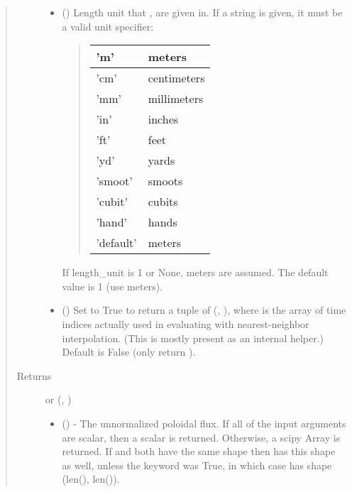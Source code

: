 \documentclass[letterpaper,10pt,english]{sphinxmanual}
\begin{document}
\begin{fulllineitems}
\begin{fulllineitems}
\begin{quote}
\begin{description}
\begin{itemize}
\item {} 
 () \textendash{} 
Length unit that ,  are given in.
If a string is given, it must be a valid unit specifier:
\begin{quote}


\begin{savenotes}\sphinxattablestart
\centering
\begin{tabulary}{\linewidth}[t]{|T|T|}
\hline

’m’
&
meters
\\
\hline
’cm’
&
centimeters
\\
\hline
’mm’
&
millimeters
\\
\hline
’in’
&
inches
\\
\hline
’ft’
&
feet
\\
\hline
’yd’
&
yards
\\
\hline
’smoot’
&
smoots
\\
\hline
’cubit’
&
cubits
\\
\hline
’hand’
&
hands
\\
\hline
’default’
&
meters
\\
\hline
\end{tabulary}
\par
\sphinxattableend\end{savenotes}
\end{quote}

If length\_unit is 1 or None, meters are assumed. The default
value is 1 (use meters).


\item {} 
 () \textendash{} Set to True to return a tuple of (,
), where  is the array of time indices
actually used in evaluating  with nearest-neighbor
interpolation. (This is mostly present as an internal helper.)
Default is False (only return ).

\end{itemize}

\item[{Returns}] \leavevmode

 or (, )
\begin{itemize}
\item {} 
 () - The unnormalized poloidal
flux. If all of the input arguments are scalar, then a scalar is
returned. Otherwise, a scipy Array is returned. If  and 
both have the same shape then  has this shape as well,
unless the  keyword was True, in which case  has
shape (len(), len()).


\end{itemize}
\end{description}
\end{quote}
\end{fulllineitems}
\end{fulllineitems}
\end{document}
